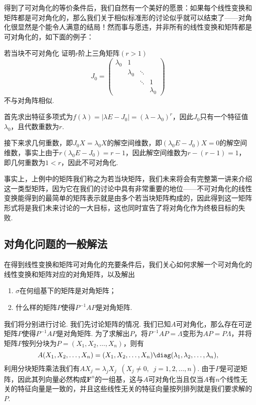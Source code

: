 得到了可对角化的等价条件后，我们自然有一个美好的愿景：如果每个线性变换和矩阵都是可对角化的，那么我们关于相似标准形的讨论似乎就可以结束了——对角化很显然是个能令人满意的结局！然而事与愿违，并非所有的线性变换和矩阵都是可对角化的，如下面的例子：
\begin{example}{}{若当块不可对角化}
    证明$r$阶上三角矩阵$(r>1)$
    \[J_0=\begin{pmatrix}
            \lambda_0 & 1         &        &           \\
                      & \lambda_0 & \ddots &           \\
                      &           & \ddots & 1         \\
                      &           &        & \lambda_0
        \end{pmatrix}\]
    不与对角阵相似.
\end{example}

\begin{solution}
    首先求出特征多项式为$f(\lambda)=|\lambda E-J_0|=(\lambda-\lambda_0)^r$，因此$J_0$只有一个特征值$\lambda_0$，且代数重数为$r$.

    接下来求几何重数，即$J_0X=\lambda_0X$的解空间维数，即$(\lambda_0 E-J_0)X=0$的解空间维数，事实上由于$r(\lambda_0 E-J_0)=r-1$，因此解空间维数为$r-(r-1)=1$，即几何重数为$1<r$，因此不可对角化.
\end{solution}

事实上，上例中的矩阵我们称之为若当块矩阵，我们未来将会有完整第一讲来介绍这一类型矩阵，因为它在我们的讨论中具有非常重要的地位——不可对角化的线性变换能得到的最简单的矩阵表示就是由多个若当块矩阵构成的，因此得到这一矩阵形式将是我们未来讨论的一大目标，这也同时宣告了将对角化作为终极目标的失败.

\subsection{对角化问题的一般解法}

在得到线性变换和矩阵可对角化的充要条件后，我们关心如何求解一个可对角化的线性变换和矩阵对应的对角矩阵，以及解出
\begin{enumerate}
    \item $\sigma$在何组基下的矩阵是对角矩阵；

    \item 什么样的矩阵$P$使得$P^{-1}AP$是对角矩阵.
\end{enumerate}

我们将分别进行讨论. 我们先讨论矩阵的情况. 我们已知$A$可对角化，那么存在可逆矩阵$P$使得$P^{-1}AP$是对角矩阵. 为了求解出$P$，将$P^{-1}AP=\varLambda$变形为$AP=P\varLambda$，并将矩阵$P$按列分块为$P=(X_1,X_2,\ldots,X_n)$，则有
\[A(X_1,X_2,\ldots,X_n)=(X_1,X_2,\ldots,X_n)\diag(\lambda_1,\lambda_2,\ldots,\lambda_n),\]
利用分块矩阵乘法我们有$AX_j=\lambda_jX_j\enspace(X_j\neq 0,\enspace j=1,2,\ldots,n)$. 由于$P$是可逆矩阵，因此其列向量必然构成$\mathbf{F}^n$的一组基，这与$A$可对角化当且仅当$A$有$n$个线性无关的特征向量是一致的，并且这些线性无关的特征向量按列排列就是我们要求解的$P$.

